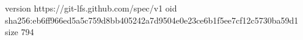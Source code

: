version https://git-lfs.github.com/spec/v1
oid sha256:eb6ff966ed5a5c759d8bb405242a7d9504e0e23ce6b1f5ee7cf12c5730ba59d1
size 794
